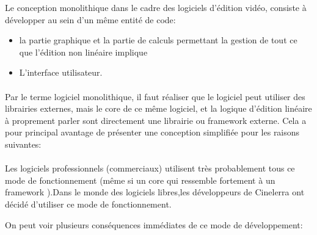 Le conception monolithique  dans le cadre des
logiciels d'édition vidéo, consiste à développer au sein d'un même
entité de code:

\begin{itemize} \setlength{\itemsep}{2mm}

  \item {la partie graphique et la partie de calculs
    permettant la gestion de tout ce que l'édition non linéaire
    implique}

  \item {L'interface utilisateur.}

\end {itemize}

\paragraph{}

Par le terme logiciel monolithique, il faut réaliser
que le logiciel peut utiliser des librairies externes, mais le core de
ce même logiciel, et la logique d'édition linéaire à proprement
parler sont directement %
une librairie ou framework  externe. Cela a pour
principal avantage de présenter une conception simplifiée pour les
raisons suivantes:

\paragraph{}

Les logiciels professionnels (commerciaux) utilisent très probablement
tous ce mode de fonctionnement (même si %
un core qui ressemble fortement à un framework ).Dans
le monde des logiciels libres,les développeurs de Cinelerra ont décidé
d'utiliser ce mode de fonctionnement.

On peut voir plusieurs conséquences immédiates de ce mode de
développement:

